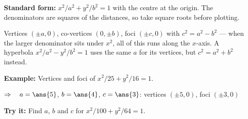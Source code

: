 \documentclass[12pt]{article}
\begin{document}
\begin{formulabox}
\textbf{Standard form:} $x^2/a^2 + y^2/b^2 = 1$ with the centre at the origin. The
denominators are squares of the distances, so take square roots before plotting.\par
\smallskip
Vertices $(\pm a, 0)$, co-vertices $(0, \pm b)$, foci $(\pm c, 0)$ with
$c^2 = a^2 - b^2$ --- when the larger denominator sits under $x^2$, all of this runs
along the $x$-axis. A hyperbola $x^2/a^2 - y^2/b^2 = 1$ uses the same $a$ for its
vertices, but $c^2 = a^2 + b^2$ instead.
\end{formulabox}

\begin{examplebox}
\textbf{Example:} \quad Vertices and foci of $x^2/25 + y^2/16 = 1$.

$\Rightarrow\quad a = \ans{5}$, $b = \ans{4}$, $c = \ans{3}$: vertices $(\pm 5, 0)$,
foci $(\pm 3, 0)$
\end{examplebox}

\begin{tryitbox}
\textbf{Try it:} \quad Find $a$, $b$ and $c$ for $x^2/100 + y^2/64 = 1$.\\[2pt]
\end{tryitbox}
\end{document}
